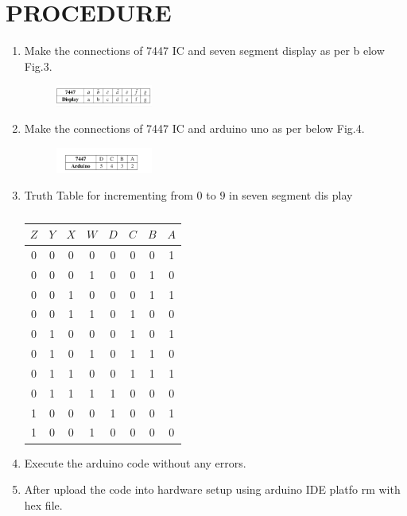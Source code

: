 \documentclass[conference]{IEEEtran}
\begin{document}
\section{PROCEDURE}


\begin{enumerate}
\item Make the connections of 7447 IC and seven segment display as per b
elow Fig.3.                                                                     \begin{figure}[h]                                                       \centering
        \includegraphics[width=0.3\textwidth]{image1.jpg}
        \caption{\label{fig-3:Gates}}
\end{figure}

\item Make the connections of 7447 IC and arduino uno as per below Fig.4.
\begin{figure}[h]
\centering
\includegraphics[width=0.3\textwidth] {image2.jpg}
\caption{\label{fig-4:Gates}}
\end{figure}

\item {Truth Table for incrementing from $0$ to $9$ in seven segment dis
play }
        \vspace{0.4cm}

\begin{table}[htbp]
    \centering
\begin{tabular}
{ | c | c | c | c | c | c | c | c | } \hline
$Z$ & $Y$ & $X$ & $W$ & $D$ & $C$ & $B$ & $A$\\\hline
0   & 0   & 0   & 0   & 0  & 0 & 0  & 1 \\
0   & 0   & 0   & 1   & 0  & 0 & 1  & 0 \\
0   & 0   & 1   & 0   & 0  & 0 & 1  & 1 \\
0   & 0   & 1   & 1   & 0  & 1 & 0  & 0 \\
0   & 1   & 0   & 0   & 0  & 1 & 0  & 1 \\
0   & 1   & 0   & 1   & 0  & 1 & 1  & 0 \\
0   & 1   & 1   & 0   & 0  & 1 & 1  & 1 \\                              0   & 1   & 1   & 1   & 1  & 0 & 0  & 0 \\
1   & 0   & 0   & 0   & 1  & 0 & 0  & 1 \\
1   & 0   & 0   & 1   & 0  & 0 & 0  & 0 \\ \hline
\end{tabular}
\vspace{0.15cm}
\caption{\label{tab:widgets}}
\end{table}                                                            \item Execute the arduino code without any errors.
\item After upload the code into hardware setup using arduino IDE platfo
rm with hex file.
 \end{enumerate}     
\end{document}
